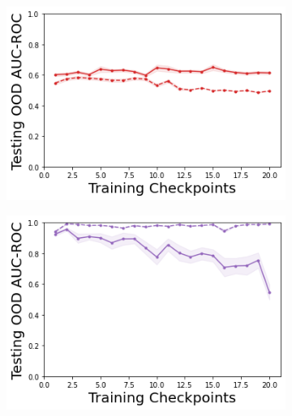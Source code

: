 \begin{figure}
    \begin{subfigure}{.24\textwidth}
        \includegraphics[width=\textwidth]{sections/011_icml2022/resources/DropOut-LunarLanderOOD-v0-AUC-ROC-epistemic_-testing-strategy.png}
    \end{subfigure}
    \begin{subfigure}{.24\textwidth}
        \includegraphics[width=\textwidth]{sections/011_icml2022/resources/Ensemble-LunarLanderOOD-v0-AUC-ROC-epistemic_-testing-strategy.png}
    \end{subfigure}
    \begin{subfigure}{.24\textwidth}

\end{subfigure}
\end{figure}
